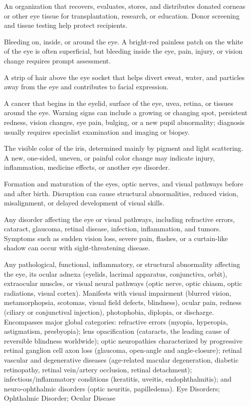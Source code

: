  An organization that recovers, evaluates, stores, and distributes donated corneas or other eye tissue for transplantation, research, or education. Donor screening and tissue testing help protect recipients.

 Bleeding on, inside, or around the eye. A bright-red painless patch on the white of the eye is often superficial, but bleeding inside the eye, pain, injury, or vision change requires prompt assessment.

 A strip of hair above the eye socket that helps divert sweat, water, and particles away from the eye and contributes to facial expression.

 A cancer that begins in the eyelid, surface of the eye, uvea, retina, or tissues around the eye. Warning signs can include a growing or changing spot, persistent redness, vision changes, eye pain, bulging, or a new pupil abnormality; diagnosis usually requires specialist examination and imaging or biopsy.

 The visible color of the iris, determined mainly by pigment and light scattering. A new, one-sided, uneven, or painful color change may indicate injury, inflammation, medicine effects, or another eye disorder.

 Formation and maturation of the eyes, optic nerves, and visual pathways before and after birth. Disruption can cause structural abnormalities, reduced vision, misalignment, or delayed development of visual skills.

 Any disorder affecting the eye or visual pathways, including refractive errors, cataract, glaucoma, retinal disease, infection, inflammation, and tumors. Symptoms such as sudden vision loss, severe pain, flashes, or a curtain-like shadow can occur with sight-threatening disease.

 Any pathological, functional, inflammatory, or structural abnormality affecting the eye, its ocular adnexa (eyelids, lacrimal apparatus, conjunctiva, orbit), extraocular muscles, or visual neural pathways (optic nerve, optic chiasm, optic radiations, visual cortex). Manifests with visual impairment (blurred vision, metamorphopsia, scotomas, visual field defects, blindness), ocular pain, redness (ciliary or conjunctival injection), photophobia, diplopia, or discharge. Encompasses major global categories: refractive errors (myopia, hyperopia, astigmatism, presbyopia); lens opacification (cataracts, the leading cause of reversible blindness worldwide); optic neuropathies characterized by progressive retinal ganglion cell axon loss (glaucoma, open-angle and angle-closure); retinal vascular and degenerative diseases (age-related macular degeneration, diabetic retinopathy, retinal vein/artery occlusion, retinal detachment); infectious/inflammatory conditions (keratitis, uveitis, endophthalmitis); and neuro-ophthalmic disorders (optic neuritis, papilledema).
\synonyms
Eye Disorders; Ophthalmic Disorder; Ocular Disease


